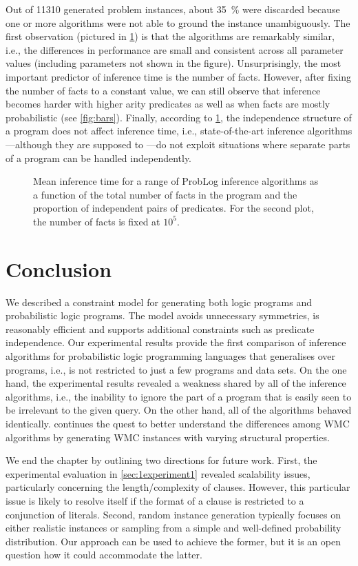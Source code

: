 Out of \num{11310} generated problem instances, about \SI{35}{\percent} were
discarded because one or more algorithms were not able to ground the instance
unambiguously. The first observation (pictured in \cref{fig:line_plots}) is that
the algorithms are remarkably similar, i.e., the differences in performance are
small and consistent across all parameter values (including parameters not shown
in the figure). Unsurprisingly, the most important predictor of inference time
is the number of facts. However, after fixing the number of facts to a constant
value, we can still observe that inference becomes harder with higher arity
predicates as well as when facts are mostly probabilistic (see \cref{fig:bars}).
Finally, according to \cref{fig:line_plots}, the independence structure of a
program does not affect inference time, i.e., state-of-the-art inference
algorithms---although they are supposed to
\citep{DBLP:conf/uai/FierensBTGR11}---do not exploit situations where separate
parts of a program can be handled independently.

\begin{figure}[t]
  \centering
  \caption{Mean inference time for a range of ProbLog inference algorithms as a
    function of the total number of facts in the program and the proportion of
    independent pairs of predicates. For the second plot, the number of facts is
    fixed at $10^5$.}\label{fig:line_plots}
\end{figure}

\section{Conclusion}

We described a constraint model for generating both logic programs and
probabilistic logic programs. The model avoids unnecessary symmetries, is
reasonably efficient and supports additional constraints such as predicate
independence. Our experimental results provide the first comparison of inference
algorithms for probabilistic logic programming languages that generalises over
programs, i.e., is not restricted to just a few programs and data sets. On the
one hand, the experimental results revealed a weakness shared by all of the
inference algorithms, i.e., the inability to ignore the part of a program that
is easily seen to be irrelevant to the given query. On the other hand, all of
the algorithms behaved identically.  continues the
quest to better understand the differences among WMC algorithms by generating
WMC instances with varying structural properties.

We end the chapter by outlining two directions for future work. First, the
experimental evaluation in \cref{sec:1experiment1} revealed scalability issues,
particularly concerning the length/complexity of clauses. However, this
particular issue is likely to resolve itself if the format of a clause is
restricted to a conjunction of literals. Second, random instance generation
typically focuses on either realistic instances or sampling from a simple and
well-defined probability distribution. Our approach can be used to achieve the
former, but it is an open question how it could accommodate the latter.
